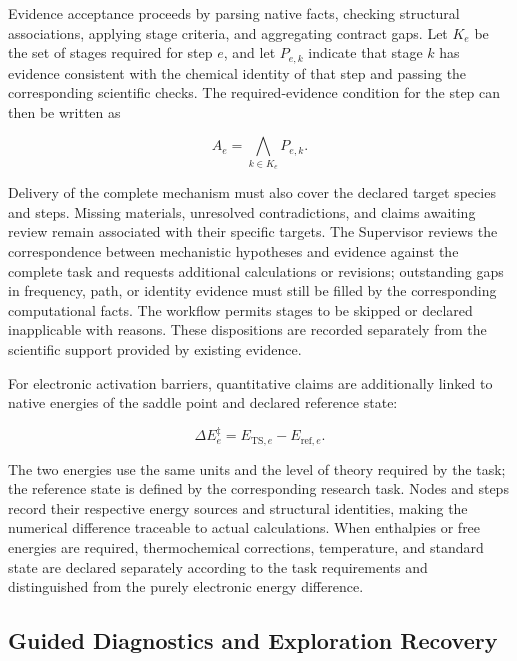 Evidence acceptance proceeds by parsing native facts, checking structural associations, applying stage criteria, and aggregating contract gaps. Let $K_e$ be the set of stages required for step $e$, and let $P_{e,k}$ indicate that stage $k$ has evidence consistent with the chemical identity of that step and passing the corresponding scientific checks. The required-evidence condition for the step can then be written as

\begin{equation}\label{eq:methods-13}
A_e=\bigwedge_{k\in K_e}P_{e,k}.
\end{equation}

Delivery of the complete mechanism must also cover the declared target species and steps. Missing materials, unresolved contradictions, and claims awaiting review remain associated with their specific targets. The Supervisor reviews the correspondence between mechanistic hypotheses and evidence against the complete task and requests additional calculations or revisions; outstanding gaps in frequency, path, or identity evidence must still be filled by the corresponding computational facts. The workflow permits stages to be skipped or declared inapplicable with reasons. These dispositions are recorded separately from the scientific support provided by existing evidence.

For electronic activation barriers, quantitative claims are additionally linked to native energies of the saddle point and declared reference state:

\begin{equation}\label{eq:methods-14}
\Delta E_e^{\ddagger}=E_{\mathrm{TS},e}-E_{\mathrm{ref},e}.
\end{equation}

The two energies use the same units and the level of theory required by the task; the reference state is defined by the corresponding research task. Nodes and steps record their respective energy sources and structural identities, making the numerical difference traceable to actual calculations. When enthalpies or free energies are required, thermochemical corrections, temperature, and standard state are declared separately according to the task requirements and distinguished from the purely electronic energy difference.

\subsection{Guided Diagnostics and Exploration Recovery}

